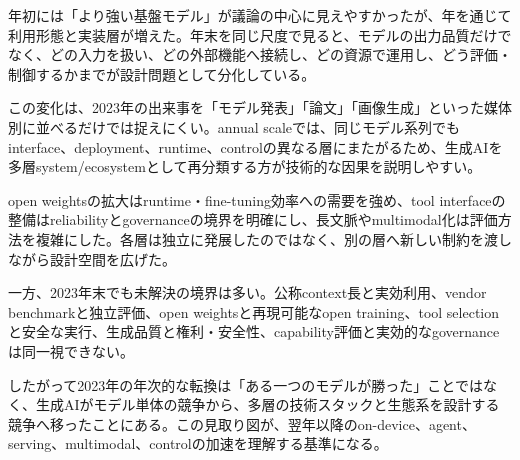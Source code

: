 
年初には「より強い基盤モデル」が議論の中心に見えやすかったが、年を通じて利用形態と実装層が増えた。年末を同じ尺度で見ると、モデルの出力品質だけでなく、どの入力を扱い、どの外部機能へ接続し、どの資源で運用し、どう評価・制御するかまでが設計問題として分化している。


この変化は、2023年の出来事を「モデル発表」「論文」「画像生成」といった媒体別に並べるだけでは捉えにくい。annual scaleでは、同じモデル系列でもinterface、deployment、runtime、controlの異なる層にまたがるため、生成AIを多層system/ecosystemとして再分類する方が技術的な因果を説明しやすい。


open weightsの拡大はruntime・fine-tuning効率への需要を強め、tool interfaceの整備はreliabilityとgovernanceの境界を明確にし、長文脈やmultimodal化は評価方法を複雑にした。各層は独立に発展したのではなく、別の層へ新しい制約を渡しながら設計空間を広げた。


一方、2023年末でも未解決の境界は多い。公称context長と実効利用、vendor benchmarkと独立評価、open weightsと再現可能なopen training、tool selectionと安全な実行、生成品質と権利・安全性、capability評価と実効的なgovernanceは同一視できない。


したがって2023年の年次的な転換は「ある一つのモデルが勝った」ことではなく、生成AIがモデル単体の競争から、多層の技術スタックと生態系を設計する競争へ移ったことにある。この見取り図が、翌年以降のon-device、agent、serving、multimodal、controlの加速を理解する基準になる。
